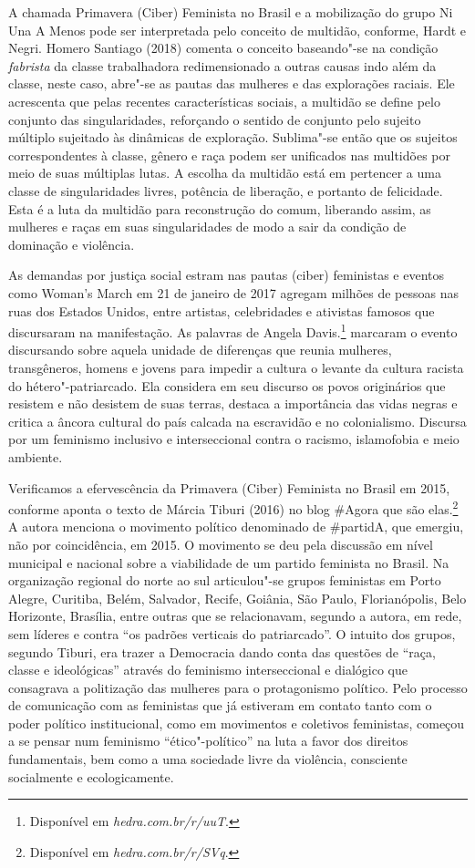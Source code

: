 A chamada Primavera (Ciber) Feminista no Brasil e a mobilização do
grupo Ni Una A Menos pode ser interpretada pelo conceito de multidão,
conforme, Hardt e Negri. Homero Santiago (2018) comenta o conceito
baseando"-se na condição \textit{fabrista} da classe trabalhadora
redimensionado a outras causas indo além da classe, neste caso, abre"-se
as pautas das mulheres e das explorações raciais. Ele acrescenta que
pelas recentes características sociais, a multidão se define pelo
conjunto das singularidades, reforçando o sentido de conjunto pelo
sujeito múltiplo sujeitado às dinâmicas de exploração. Sublima"-se então
que os sujeitos correspondentes à classe, gênero e raça podem ser
unificados nas multidões por meio de suas múltiplas lutas. A escolha da
multidão está em pertencer a uma classe de singularidades livres,
potência de liberação, e portanto de felicidade. Esta é a luta da
multidão para reconstrução do comum, liberando assim, as mulheres e
raças em suas singularidades de modo a sair da condição de dominação e
violência.

As demandas por justiça social estram nas pautas (ciber) feministas e
eventos como Woman's March em 21 de janeiro de 2017 agregam milhões de
pessoas nas ruas dos Estados Unidos, entre artistas, celebridades e
ativistas famosos que discursaram na manifestação. As palavras de Angela
Davis.\footnote{Disponível em \textit{hedra.com.br/r/uuT}.} marcaram o evento discursando sobre aquela
unidade de diferenças que reunia mulheres, transgêneros, homens e jovens
para impedir a cultura o levante da cultura racista do
hétero"-patriarcado. Ela considera em seu discurso os povos originários
que resistem e não desistem de suas terras, destaca a importância das
vidas negras e critica a âncora cultural do país calcada na escravidão e
no colonialismo. Discursa por um feminismo inclusivo e interseccional
contra o racismo, islamofobia e meio ambiente.

Verificamos a efervescência da Primavera (Ciber) Feminista no Brasil em
2015, conforme aponta o texto de Márcia Tiburi (2016) no blog \#Agora
que são elas.\footnote{Disponível em \textit{hedra.com.br/r/SVq}.} A autora menciona o movimento político
denominado de \#partidA, que emergiu, não por coincidência, em 2015. O
movimento se deu pela discussão em nível municipal e nacional sobre a
viabilidade de um partido feminista no Brasil. Na organização regional
do norte ao sul articulou"-se grupos feministas em Porto Alegre,
Curitiba, Belém, Salvador, Recife, Goiânia, São Paulo, Florianópolis,
Belo Horizonte, Brasília, entre outras que se relacionavam, segundo a
autora, em rede, sem líderes e contra ``os padrões verticais do
patriarcado''. O intuito dos grupos, segundo Tiburi, era trazer a
Democracia dando conta das questões de ``raça, classe e ideológicas''
através do feminismo interseccional e dialógico que consagrava a
politização das mulheres para o protagonismo político. Pelo processo de
comunicação com as feministas que já estiveram em contato tanto com o
poder político institucional, como em movimentos e coletivos feministas,
começou a se pensar num feminismo ``ético"-político'' na luta a favor dos
direitos fundamentais, bem como a uma sociedade livre da violência,
consciente socialmente e ecologicamente.

